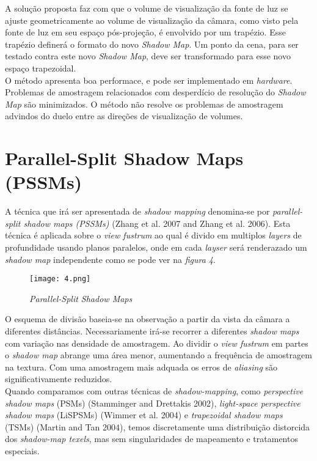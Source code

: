 \documentclass[12pt]{article}
\begin{document}
A solução proposta faz com que o volume de visualização da fonte de luz se ajuste geometricamente ao volume de visualização da câmara, como visto pela fonte de luz em seu espaço pós-projeção, é envolvido por um trapézio. Esse trapézio definerá o formato do novo {\it Shadow Map}. Um ponto da cena, para ser testado contra este novo {\it Shadow Map}, deve ser transformado para esse novo espaço trapezoidal. \\

O método apresenta boa performace, e pode ser implementado em {\it hardware}. Problemas de amostragem relacionados com desperdício de resolução do {\it Shadow Map} são minimizados. O método não resolve os problemas de amostragem advindos do duelo entre as direções de visualização de volumes.

\section{Parallel-Split Shadow Maps (PSSMs)}
\vspace{10 mm}
\hspace{7 mm}A técnica que irá ser apresentada de {\it shadow mapping} denomina-se por {\it parallel-split shadow maps (PSSMs)} (Zhang et al. 2007 and Zhang et al. 2006). Esta técnica é aplicada sobre o {\it view fustrum} ao qual é divido em multiplos {\it layers} de profundidade usando planos paralelos, onde  em cada {\it layser} será renderazado um {\it shadow map} independente como se pode ver na {\it figura 4}.

\begin{figure}[!h]
\centering
\texttt{[image: 4.png]}
\caption{{\it Parallel-Split Shadow Maps}}
\label{img4}
\end{figure}


O esquema de divisão baseia-se na observação a partir da vista da câmara a diferentes distâncias. Necessariamente irá-se recorrer a diferentes {\it shadow maps} com variação nas densidade de amostragem. Ao dividir o {\it view fustrum} em partes o {\it shadow map} abrange uma área menor, aumentando a frequência de amostragem na textura. Com uma amostragem mais adquada os erros de {\it aliasing} são significativamente reduzidos.\\

Quando comparamos com outras técnicas de {\it  shadow-mapping}, como {\it perspective shadow maps} (PSMs) (Stamminger and Drettakis 2002), {\it light-space perspective shadow maps} (LiSPSMs) (Wimmer et al. 2004) e {\it trapezoidal shadow maps} (TSMs) (Martin and Tan 2004), temos discretamente uma distribuição distorcida dos {\it shadow-map texels}, mas sem singularidades de mapeamento e tratamentos especiais.\\
\end{document}

